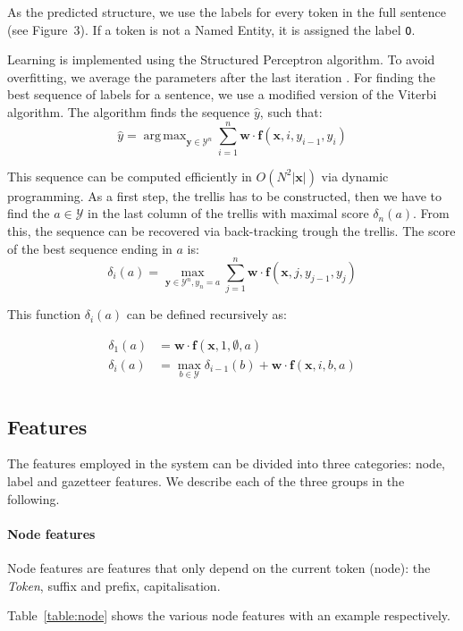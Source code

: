 \documentclass[11pt]{article}
\DeclareMathOperator*{\argmax}{arg\,max}
\newcommand{\namedentity}{Named Entity}
\newcommand{\Oo}{\texttt O}
\begin{document}
As the predicted structure, we use the labels for every token in the full sentence (see Figure~3). If a token is not a \namedentity, it is assigned the label \Oo.

Learning is implemented using the Structured Perceptron algorithm. To avoid overfitting, we average the parameters after the last iteration \cite{collins2002discriminative}. 
For finding the best sequence of labels for a sentence, we use a modified version of the Viterbi algorithm. The algorithm finds the sequence $\hat{y}$, such that:
\[
\hat{y} = \argmax_{\mathbf{y} \in \mathcal{Y}^{n}} \sum_{i=1}^{n}\mathbf{w} \cdot \boldsymbol{f}(\mathbf{x}, i, y_{i-1}, y_{i})
\]

This sequence can be computed efficiently in $ O( N^2 |\mathbf{x}| ) $ via dynamic programming. 
As a first step, the trellis has to be constructed, then we have to find the $ a \in \mathcal{Y}$ in the 
last column of the trellis with maximal score $\delta_n(a)$. From this, the sequence can be recovered via back-tracking trough the trellis. 
The score of the best sequence ending in $a$ is:
\[
\delta_i(a) = \max_{\mathbf{y} \in \mathcal{Y}^{n}, y_n = a} \sum_{j=1}^{n}{\mathbf{w} \cdot \boldsymbol{f}(\mathbf{x}, j, y_{j-1}, y_{j})}
\]

\noindent This function $\delta_i(a)$ can be defined recursively as:

\begin{align*}
\delta_1(a) &= \mathbf{w} \cdot \boldsymbol{f}(\mathbf{x}, 1, \emptyset, a) \\
\delta_i(a) &= \max_{b \in \mathcal{Y}} \delta_{i-1}(b) + \mathbf{w} \cdot \boldsymbol{f}(\mathbf{x}, i, b, a) \\
\end{align*}


\subsection{Features}
The features employed in the system can be divided into three categories: node, label and gazetteer features. 
We describe each of the three groups in the following.

\paragraph*{Node features}
Node features are features that only depend on the current token (node): the \emph{Token}, suffix and prefix, capitalisation.

Table~\ref{table:node} shows the various node features with an example respectively.
\end{document}
